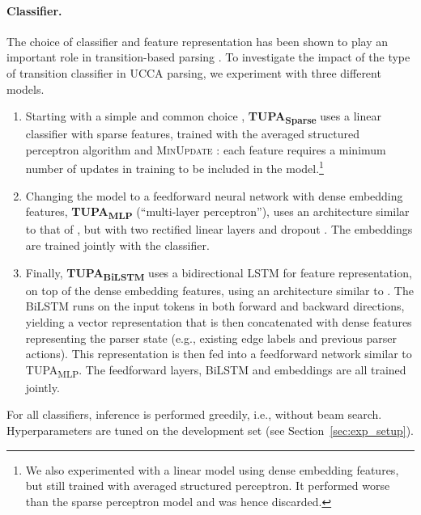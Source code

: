 \documentclass[11pt,a4paper]{article}
\newcommand{\parser}[1]{TUPA\textsubscript{#1}}
\newcommand{\secref}[1]{Section~\ref{#1}}
\begin{document}
\paragraph{Classifier.}
The choice of classifier and feature representation has been shown to play an important role in
transition-based parsing \cite{chen2014fast,andor2016globally,kiperwasser2016simple}.
To investigate the impact of the type of transition classifier in UCCA parsing,
we experiment with three different models.
\begin{enumerate}[leftmargin=*]
\item
Starting with a simple and common choice \cite[e.g.,][]{maier-lichte:2016:DiscoNLP},
\textbf{\parser{Sparse}} uses a linear classifier with sparse features, trained with
the averaged structured perceptron algorithm
\cite{Coll:04} and \textsc{MinUpdate} \cite{goldberg2011learning}:
each feature requires a minimum number of updates in training
to be included in the model.\footnote{We also experimented with a linear model using
dense embedding features, but still trained with averaged structured perceptron.
It performed worse than the sparse perceptron model and was hence discarded.}
\item
Changing the model to a feedforward neural network with dense embedding features,
\textbf{\parser{MLP}}
(``multi-layer perceptron''), uses an architecture similar to that of \citet{chen2014fast},
but with two rectified linear layers
and dropout \cite{srivastava2014dropout}.
The embeddings are trained jointly with the classifier.
\item
Finally, \textbf{\parser{BiLSTM}} uses a bidirectional LSTM for feature representation,
on top of the dense embedding features,
using an architecture similar to \citet{kiperwasser2016simple}.
The BiLSTM runs on the input tokens in both forward and backward directions,
yielding a vector representation that is then concatenated with dense features representing the
parser state (e.g., existing edge labels and previous parser actions).
This representation is then fed into a feedforward network similar to \parser{MLP}.
The feedforward layers, BiLSTM and embeddings are all trained jointly.
\end{enumerate}

For all classifiers, inference is performed greedily, i.e., without beam search.
Hyperparameters are tuned on the development set (see \secref{sec:exp_setup}).
\end{document}
